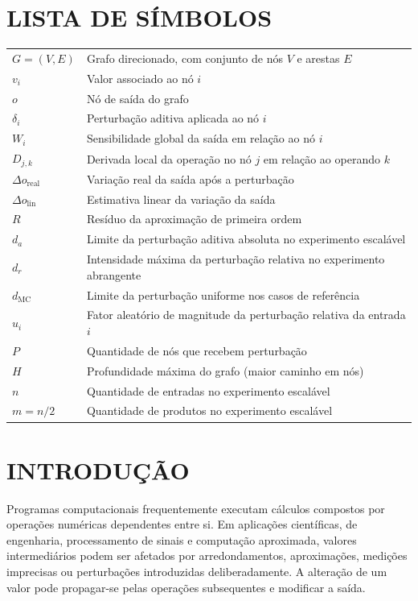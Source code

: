 \documentclass[12pt,openright,oneside,a4paper,brazil]{abntex2}
\begin{document}
\chapter*{LISTA DE SÍMBOLOS}
\begin{tabularx}{\textwidth}{lY}
$G=(V,E)$ & Grafo direcionado, com conjunto de nós $V$ e arestas $E$\\
$v_i$ & Valor associado ao nó $i$\\
$o$ & Nó de saída do grafo\\
$\delta_i$ & Perturbação aditiva aplicada ao nó $i$\\
$W_i$ & Sensibilidade global da saída em relação ao nó $i$\\
$D_{j,k}$ & Derivada local da operação no nó $j$ em relação ao operando $k$\\
$\Delta o_{\mathrm{real}}$ & Variação real da saída após a perturbação\\
$\Delta o_{\mathrm{lin}}$ & Estimativa linear da variação da saída\\
$R$ & Resíduo da aproximação de primeira ordem\\
$d_a$ & Limite da perturbação aditiva absoluta no experimento escalável\\
$d_r$ & Intensidade máxima da perturbação relativa no experimento abrangente\\
$d_{\mathrm{MC}}$ & Limite da perturbação uniforme nos casos de referência\\
$u_i$ & Fator aleatório de magnitude da perturbação relativa da entrada $i$\\
$P$ & Quantidade de nós que recebem perturbação\\
$H$ & Profundidade máxima do grafo (maior caminho em nós)\\
$n$ & Quantidade de entradas no experimento escalável\\
$m=n/2$ & Quantidade de produtos no experimento escalável
\end{tabularx}

\clearpage
{}
\tableofcontents*

\textual

\chapter{INTRODUÇÃO}

Programas computacionais frequentemente executam cálculos compostos por operações numéricas dependentes entre si. Em aplicações científicas, de engenharia, processamento de sinais e computação aproximada, valores intermediários podem ser afetados por arredondamentos, aproximações, medições imprecisas ou perturbações introduzidas deliberadamente. A alteração de um valor pode propagar-se pelas operações subsequentes e modificar a saída.
\end{document}
